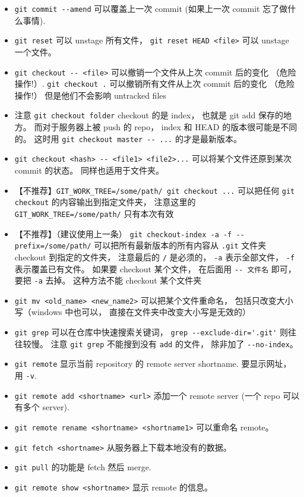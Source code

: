\begin{itemize}
\item \verb|git commit --amend| 可以覆盖上一次 commit (如果上一次 commit 忘了做什么事情).
\item \verb|git reset| 可以 unstage 所有文件， \verb|git reset HEAD <file>| 可以 unstage 一个文件。
\item \verb|git checkout -- <file>| 可以撤销一个文件从上次 commit 后的变化 （危险操作!）. \verb|git checkout .| 可以撤销所有文件从上次 commit 后的变化 （危险操作!） 但是他们不会影响 untracked files
\item 注意 \verb|git checkout folder| checkout 的是 index， 也就是 git add 保存的地方。 而对于服务器上被 push 的 repo， index 和 HEAD 的版本很可能是不同的。 这时用 \verb|git checkout master -- ...| 的才是最新版本。
\item \verb|git checkout <hash> -- <file1> <file2>...| 可以将某个文件还原到某次 commit 的状态。 同样也适用于文件夹。
\item 【不推荐】\verb|GIT_WORK_TREE=/some/path/ git checkout ...| 可以把任何 \verb|git checkout| 的内容输出到指定文件夹， 注意这里的 \verb|GIT_WORK_TREE=/some/path/| 只有本次有效
\item 【不推荐】（建议使用上一条） \verb|git checkout-index -a -f --prefix=/some/path/| 可以把所有最新版本的所有内容从 \verb|.git| 文件夹 checkout 到指定的文件夹， 注意最后的 \verb|/| 是必须的， \verb|-a| 表示全部文件， \verb|-f| 表示覆盖已有文件。 如果要 checkout 某个文件， 在后面用 \verb|-- 文件名| 即可， 要把 \verb|-a| 去掉。 这种方法不能 checkout 某个文件夹
\item \verb|git mv <old_name> <new_name2>| 可以把某个文件重命名， 包括只改变大小写（windows 中也可以， 直接在文件夹中改变大小写是无效的）
\item \verb|git grep| 可以在仓库中快速搜索关键词， \verb|grep --exclude-dir='.git'| 则往往较慢。 注意 \verb|git grep| 不能搜到没有 \verb|add| 的文件， 除非加了 \verb|--no-index|。
\item \verb|git remote| 显示当前 repository 的 remote server shortname. 要显示网址， 用 \verb|-v|.
\item \verb|git remote add <shortname> <url>| 添加一个 remote server (一个 repo 可以有多个 server).
\item \verb|git remote rename <shortname> <shortname1>| 可以重命名 remote。
\item \verb|git fetch <shortname>| 从服务器上下载本地没有的数据。
\item \verb|git pull| 的功能是 fetch 然后 merge.
\item \verb|git remote show <shortname>| 显示 remote 的信息。

\end{itemize}
